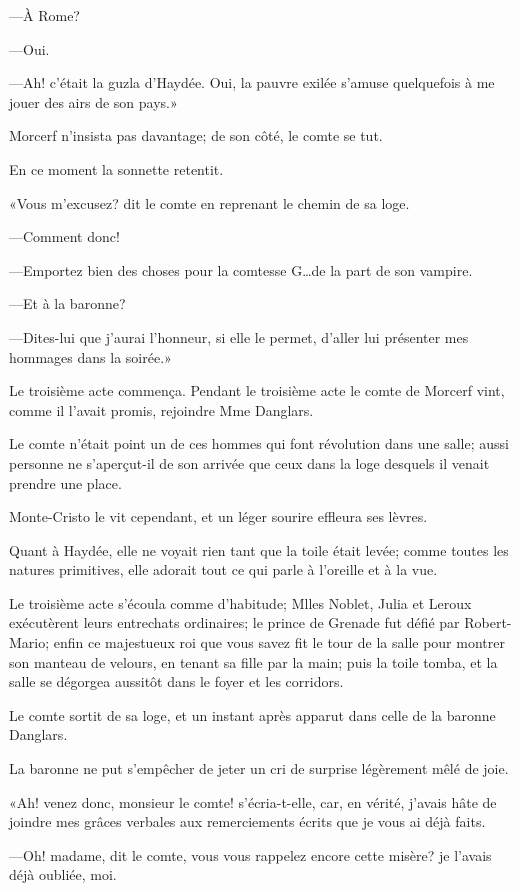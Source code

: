 —À Rome? 

—Oui. 

—Ah! c'était la guzla d'Haydée. Oui, la pauvre exilée s'amuse quelquefois à me jouer des airs de son pays.» 

Morcerf n'insista pas davantage; de son côté, le comte se tut. 

En ce moment la sonnette retentit. 

«Vous m'excusez? dit le comte en reprenant le chemin de sa loge. 

—Comment donc! 

—Emportez bien des choses pour la comtesse G\dots de la part de son vampire. 

—Et à la baronne? 

—Dites-lui que j'aurai l'honneur, si elle le permet, d'aller lui présenter mes hommages dans la soirée.» 

Le troisième acte commença. Pendant le troisième acte le comte de Morcerf vint, comme il l'avait promis, rejoindre Mme Danglars. 

Le comte n'était point un de ces hommes qui font révolution dans une salle; aussi personne ne s'aperçut-il de son arrivée que ceux dans la loge desquels il venait prendre une place. 

Monte-Cristo le vit cependant, et un léger sourire effleura ses lèvres. 

Quant à Haydée, elle ne voyait rien tant que la toile était levée; comme toutes les natures primitives, elle adorait tout ce qui parle à l'oreille et à la vue. 

Le troisième acte s'écoula comme d'habitude; Mlles Noblet, Julia et Leroux exécutèrent leurs entrechats ordinaires; le prince de Grenade fut défié par Robert-Mario; enfin ce majestueux roi que vous savez fit le tour de la salle pour montrer son manteau de velours, en tenant sa fille par la main; puis la toile tomba, et la salle se dégorgea aussitôt dans le foyer et les corridors. 

Le comte sortit de sa loge, et un instant après apparut dans celle de la baronne Danglars. 

La baronne ne put s'empêcher de jeter un cri de surprise légèrement mêlé de joie. 

«Ah! venez donc, monsieur le comte! s'écria-t-elle, car, en vérité, j'avais hâte de joindre mes grâces verbales aux remerciements écrits que je vous ai déjà faits. 

—Oh! madame, dit le comte, vous vous rappelez encore cette misère? je l'avais déjà oubliée, moi. 

